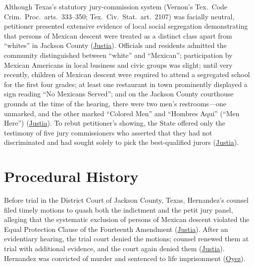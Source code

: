 \documentclass[12pt]{article}
\begin{document}
Although Texas's statutory jury-commission system (Vernon's Tex.\ Code Crim.\ Proc.\ arts.\ 333--350; Tex.\ Civ.\ Stat.\ art.\ 2107) was facially neutral, petitioner presented extensive evidence of local social segregation demonstrating that persons of Mexican descent were treated as a distinct class apart from ``whites'' in Jackson County (\href{https://supreme.justia.com/cases/federal/us/347/475/}{Justia}). Officials and residents admitted the community distinguished between ``white'' and ``Mexican''; participation by Mexican Americans in local business and civic groups was slight; until very recently, children of Mexican descent were required to attend a segregated school for the first four grades; at least one restaurant in town prominently displayed a sign reading ``No Mexicans Served''; and on the Jackson County courthouse grounds at the time of the hearing, there were two men's restrooms---one unmarked, and the other marked ``Colored Men'' and ``Hombres Aqui'' (``Men Here'') (\href{https://supreme.justia.com/cases/federal/us/347/475/}{Justia}). To rebut petitioner's showing, the State offered only the testimony of five jury commissioners who asserted that they had not discriminated and had sought solely to pick the best-qualified jurors (\href{https://supreme.justia.com/cases/federal/us/347/475/}{Justia}).

\section{Procedural History}
Before trial in the District Court of Jackson County, Texas, Hernandez's counsel filed timely motions to quash both the indictment and the petit jury panel, alleging that the systematic exclusion of persons of Mexican descent violated the Equal Protection Clause of the Fourteenth Amendment (\href{https://supreme.justia.com/cases/federal/us/347/475/}{Justia}). After an evidentiary hearing, the trial court denied the motions; counsel renewed them at trial with additional evidence, and the court again denied them (\href{https://supreme.justia.com/cases/federal/us/347/475/}{Justia}). Hernandez was convicted of murder and sentenced to life imprisonment (\href{https://www.oyez.org/cases/1940-1955/347us475}{Oyez}).
\end{document}
